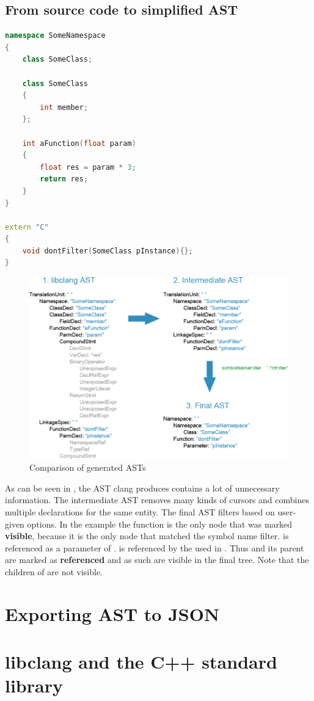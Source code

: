 \newpage
\subsection{From source code to simplified AST}
\SingleSpacing
\begin{lstlisting}[language=C++, caption=Example input code for CPPAnalyzer]
namespace SomeNamespace
{
	class SomeClass;
	
	class SomeClass
	{
		int member;
	};
	
	int aFunction(float param)
	{
		float res = param * 3;
		return res;
	}
}

extern "C"
{
	void dontFilter(SomeClass pInstance){};
}
\end{lstlisting}
\OnehalfSpacing

\vspace{15pt}
\begin{figure}[h] %
	\centering
		\includegraphics[scale=0.45]{Images/TreeExample.png}
	\caption{Comparison of generated ASTs}
	\label{fig:TreeExample}
\end{figure}


As can be seen in , the AST clang produces contains a lot of unnecessary information. The intermediate AST removes many kinds of cursors and combines multiple declarations for the same entity. The final AST filters based on user-given options. In the example the function  is the only node that was marked \textbf{visible}, because it is the only node that matched the symbol name filter.  is referenced as a parameter of .  is referenced by the  used in . Thus  and its parent  are marked as \textbf{referenced} and as such are visible in the final tree. Note that the children of  are not visible.

\section{Exporting AST to JSON}

\section{libclang and the C++ standard library}
